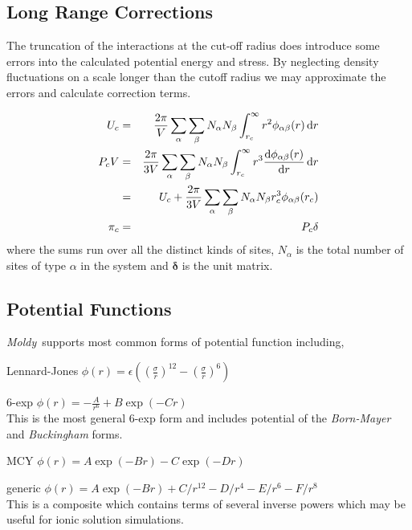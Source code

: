 \documentclass[a4paper,twoside]{report}
\providecommand{\bm}[1]{\mathbf{#1}}
\newcommand{\moldy}{\emph{Moldy}}
\begin{document}
\subsection{Long Range Corrections}
The truncation of the interactions at the cut-off radius does
introduce some errors into the calculated potential energy and stress.
By neglecting density fluctuations on a scale longer than the cutoff
radius we may approximate the errors and calculate correction 
terms\cite[pp 64-65]{allen:87}.

\begin{eqnarray}
U_c & = & \frac{2\pi}{V} \sum_\alpha \sum_\beta N_\alpha N_\beta 
               \int_{r_c}^\infty r^2 \phi_{\alpha\beta}(r) \, \Calcd r \\
P_c V & = & \frac{2\pi}{3 V} \sum_\alpha \sum_\beta N_\alpha N_\beta 
               \int_{r_c}^\infty r^3 
               \frac{\Calcd\phi_{\alpha\beta}(r)}{\Calcd r}
                \, \Calcd r \nonumber \\ 
           & = & U_c + \frac{2\pi}{3 V} \sum_\alpha \sum_\beta
           N_\alpha N_\beta r_c^3 \phi_{\alpha\beta}(r_c) \\
\bm{\pi}_c & = & P_c \bm{\delta}
\end{eqnarray}
where the sums run over all the distinct kinds of sites,
$N_\alpha$ is the total number of sites of type $\alpha$ in the system
and $\bm{\delta}$ is the unit matrix.


\subsection{Potential Functions}
\label{sec:potentials}
\moldy\ supports most common forms of potential function including,
\begin{list}{}{%
\setlength{\parsep}{0in} 
\setlength{\labelwidth}{1in}
\setlength{\labelsep}{0.25in}
\setlength{\leftmargin}{1.5in}
\renewcommand{\makelabel}[1]{\hspace{\labelsep}\emph{#1} \hfil}}
\item[Lennard-Jones] $\phi(r) = \epsilon((\frac{\sigma}{r})^{12} -
(\frac{\sigma}{r})^{6})$
\item[6-exp] $\phi(r) = -\frac{A}{r^{6}} +
B\exp(-Cr)$\\
This is the most general 6-exp form and
includes potential of the \emph{Born-Mayer} and \emph{Buckingham} forms.
\item[MCY] $\phi(r) = A \exp(-Br) - C \exp(-Dr)$
\item[generic]  $\phi(r) = A \exp(-Br) + C/r^{12} - D/r^4 -E/r^6 -F/r^8$\\
This is a composite which contains terms of several inverse powers
which may be useful for ionic solution simulations.
\end{list}
\end{document}
